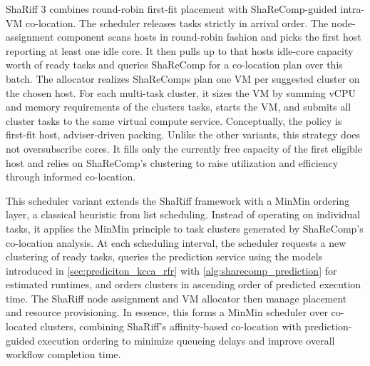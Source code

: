 ShaRiff 3 combines round-robin first-fit placement with ShaReComp-guided intra-VM co-location. The scheduler releases tasks strictly in arrival order. The node-assignment component scans hosts in round-robin fashion and picks the first host reporting at least one idle core. It then pulls up to that hosts idle-core capacity worth of ready tasks and queries ShaReComp for a co-location plan over this batch.
The allocator realizes ShaReComps plan one VM per suggested cluster on the chosen host. For each multi-task cluster, it sizes the VM by summing vCPU and memory requirements of the clusters tasks, starts the VM, and submits all cluster tasks to the same virtual compute service.
Conceptually, the policy is first-fit host, adviser-driven packing. Unlike the other variants, this strategy does not oversubscribe cores. It fills only the currently free capacity of the first eligible host and relies on ShaReComp's clustering to raise utilization and efficiency through informed co-location.

This scheduler variant extends the ShaRiff framework with a MinMin ordering layer, a classical heuristic from list scheduling. Instead of operating on individual tasks, it applies the MinMin principle to task clusters generated by ShaReComp's co-location analysis. At each scheduling interval, the scheduler requests a new clustering of ready tasks, queries the prediction service using the models introduced in \ref{sec:prediciton_kcca_rfr} with \ref{alg:sharecomp_prediction} for estimated runtimes, and orders clusters in ascending order of predicted execution time. The ShaRiff node assignment and VM allocator then manage placement and resource provisioning. In essence, this forms a MinMin scheduler over co-located clusters, combining ShaRiff's affinity-based co-location with prediction-guided execution ordering to minimize queueing delays and improve overall workflow completion time.

